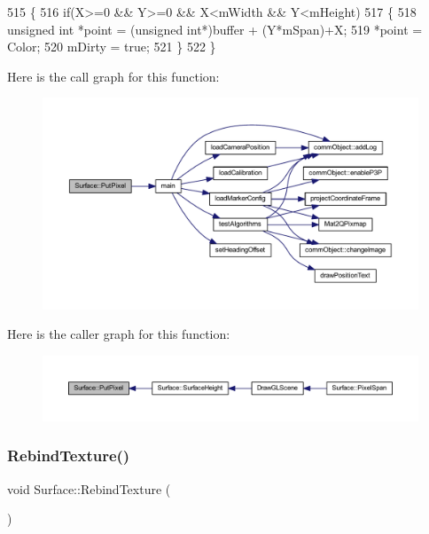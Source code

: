 \begin{DoxyCode}
515 \{
516     \textcolor{keywordflow}{if}(X>=0 && Y>=0 && X<mWidth && Y<mHeight)
517     \{
518         \textcolor{keywordtype}{unsigned} \textcolor{keywordtype}{int} *point = (\textcolor{keywordtype}{unsigned} \textcolor{keywordtype}{int}*)buffer + (Y*mSpan)+X;
519         *point = Color;
520         mDirty = \textcolor{keyword}{true};
521     \}
522 \}
\end{DoxyCode}
Here is the call graph for this function\+:
\nopagebreak
\begin{figure}[H]
\begin{center}
\leavevmode
\includegraphics[width=350pt]{class_surface_a728571d0386e9690ce1760931562c72b_cgraph}
\end{center}
\end{figure}
Here is the caller graph for this function\+:
\nopagebreak
\begin{figure}[H]
\begin{center}
\leavevmode
\includegraphics[width=350pt]{class_surface_a728571d0386e9690ce1760931562c72b_icgraph}
\end{center}
\end{figure}
\mbox{\label{class_surface_aa75c49f53fec5c49ba8422c0d64815e6}} 
\subsubsection{\texorpdfstring{Rebind\+Texture()}{RebindTexture()}}
{\footnotesize\ttfamily void Surface\+::\+Rebind\+Texture (\begin{DoxyParamCaption}{ }\end{DoxyParamCaption})}




